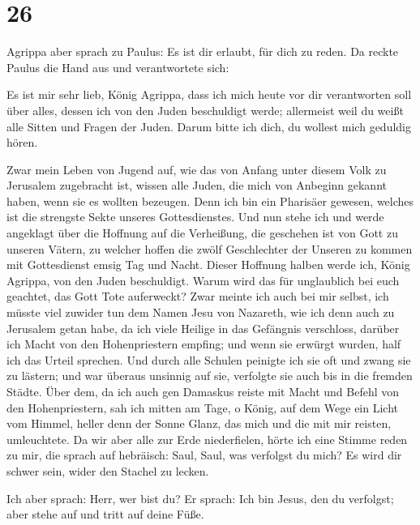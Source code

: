 \hypertarget{section-25}{%
\section{26}\label{section-25}}

 Agrippa aber sprach zu Paulus: Es ist dir erlaubt, für
dich zu reden. Da reckte Paulus die Hand aus und verantwortete sich:

 Es ist mir sehr lieb, König Agrippa, dass ich mich heute
vor dir verantworten soll über alles, dessen ich von den Juden
beschuldigt werde;  allermeist weil du weißt alle Sitten
und Fragen der Juden. Darum bitte ich dich, du wollest mich geduldig
hören.

 Zwar mein Leben von Jugend auf, wie das von Anfang unter
diesem Volk zu Jerusalem zugebracht ist, wissen alle Juden,
 die mich von Anbeginn gekannt haben, wenn sie es wollten
bezeugen. Denn ich bin ein Pharisäer gewesen, welches ist die strengste
Sekte unseres Gottesdienstes.  Und nun stehe ich und werde
angeklagt über die Hoffnung auf die Verheißung, die geschehen ist von
Gott zu unseren Vätern,  zu welcher hoffen die zwölf
Geschlechter der Unseren zu kommen mit Gottesdienst emsig Tag und Nacht.
Dieser Hoffnung halben werde ich, König Agrippa, von den Juden
beschuldigt.  Warum wird das für unglaublich bei euch
geachtet, das Gott Tote auferweckt?  Zwar meinte ich auch
bei mir selbst, ich müsste viel zuwider tun dem Namen Jesu von Nazareth,
 wie ich denn auch zu Jerusalem getan habe, da ich viele
Heilige in das Gefängnis verschloss, darüber ich Macht von den
Hohenpriestern empfing; und wenn sie erwürgt wurden, half ich das Urteil
sprechen.  Und durch alle Schulen peinigte ich sie oft
und zwang sie zu lästern; und war überaus unsinnig auf sie, verfolgte
sie auch bis in die fremden Städte.  Über dem, da ich
auch gen Damaskus reiste mit Macht und Befehl von den Hohenpriestern,
 sah ich mitten am Tage, o König, auf dem Wege ein Licht
vom Himmel, heller denn der Sonne Glanz, das mich und die mit mir
reisten, umleuchtete.  Da wir aber alle zur Erde
niederfielen, hörte ich eine Stimme reden zu mir, die sprach auf
hebräisch: Saul, Saul, was verfolgst du mich? Es wird dir schwer sein,
wider den Stachel zu lecken.

 Ich aber sprach: Herr, wer bist du? Er sprach: Ich bin
Jesus, den du verfolgst; aber stehe auf und tritt auf deine Füße.

